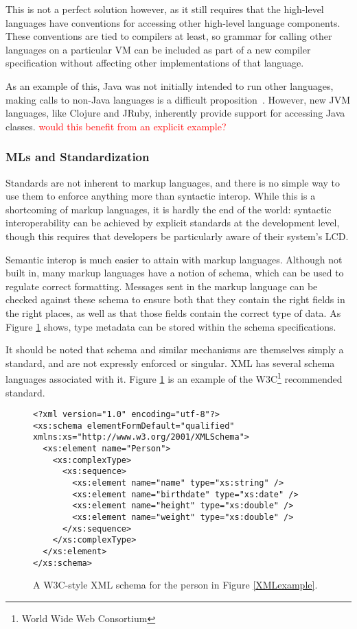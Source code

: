 \documentclass{sig-alternate}
\newcommand{\mycomment}[1]{\textcolor{red}{#1}}
\begin{document}
This is not a perfect solution however, as it still requires that the high-level languages have conventions for accessing other high-level language components.
These conventions are tied to compilers at least, so grammar for calling other languages on a particular VM can be included as part of a new compiler specification without affecting other implementations of that language.

As an example of this, Java was not initially intended to run other languages, making calls to non-Java languages is a difficult proposition~\cite{Chisnall:2013}. However, new JVM languages, like Clojure and JRuby, inherently provide support for accessing Java classes. \mycomment{would this benefit from an explicit example?}


\subsubsection*{MLs and Standardization}
Standards are not inherent to markup languages, and there is no simple way to use them to enforce anything more than syntactic interop. While this is a shortcoming of markup languages, it is hardly the end of the world: syntactic interoperability can be achieved by explicit standards at the development level, though this requires that developers be particularly aware of their system's LCD.

Semantic interop is much easier to attain with markup languages. Although not built in, many markup languages have a notion of schema, which can be used to regulate correct formatting. Messages sent in the markup language can be checked against these schema to ensure both that they contain the right fields in the right places, as well as that those fields contain the correct type of data. As Figure \ref{XMLschema} shows, type metadata can be stored within the schema specifications.

It should be noted that schema and similar mechanisms are themselves simply a standard, and are not expressly enforced or singular. XML has several schema languages associated with it. Figure \ref{XMLschema} is an example of the W3C\footnote{World Wide Web Consortium} recommended standard.


\begin{figure}
\begin{verbatim}
<?xml version="1.0" encoding="utf-8"?>
<xs:schema elementFormDefault="qualified" xmlns:xs="http://www.w3.org/2001/XMLSchema">
  <xs:element name="Person">
    <xs:complexType>
      <xs:sequence>
        <xs:element name="name" type="xs:string" />
        <xs:element name="birthdate" type="xs:date" />
        <xs:element name="height" type="xs:double" />
        <xs:element name="weight" type="xs:double" />
      </xs:sequence>
    </xs:complexType>
  </xs:element>
</xs:schema>
\end{verbatim}
\caption{A W3C-style XML schema for the person in Figure \ref{XMLexample}.}
\label{XMLschema}
\end{figure}
\end{document}

